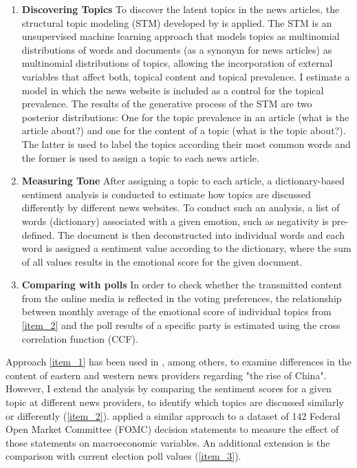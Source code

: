 \documentclass[12pt,a4paper,notitlepage]{article}
\begin{document}
\begin{enumerate}
	\item\label{item_1} \textbf{Discovering Topics} To discover the latent topics in the news articles, the structural topic modeling (STM) developed by \citet{roberts_model_2016} is applied. The STM is an unsupervised machine learning approach that models topics as multinomial distributions of words and documents (as a synonym for news articles) as multinomial distributions of topics, allowing the incorporation of external variables that affect both, topical content and topical prevalence. I estimate a model in which the news website is included as a control for the topical prevalence. The results of the generative process of the STM are two posterior distributions: One for the topic prevalence in an article (what is the article about?) and one for the content of a topic (what is the topic about?). The latter is used to label the topics according their most common words and the former is used to assign a topic to each news article. 
	\item\label{item_2} \textbf{Measuring Tone} After assigning a topic to each article, a dictionary-based sentiment analysis is conducted to estimate how topics are discussed differently by different news websites. To conduct such an analysis, a list of words (dictionary) associated with a given emotion, such as negativity is pre-defined. The document is then deconstructed into individual words and each word is assigned a sentiment value according to the dictionary, where the sum of all values results in the emotional score for the given document.   
	\item\label{item_3} \textbf{Comparing with polls} In order to check whether the transmitted content from the online media is reflected in the voting preferences, the relationship between monthly average of the emotional score of individual topics from \ref{item_2} and the poll results of a specific party is estimated using the cross correlation function (CCF).
\end{enumerate}

Approach \ref{item_1} has been used in \citet{roberts_model_2016}, among others, to examine differences in the content of eastern and western news providers regarding "the rise of China". However, I extend the analysis by comparing the sentiment scores for a given topic at different news providers, to identify which topics are discussed similarly or differently (\ref{item_2}). \citet{hansen_shocking_2016} applied a similar approach to a dataset of 142 Federal Open Market Committee (FOMC) decision statements to measure the effect of those statements on macroeconomic variables. An additional extension is the comparison with current election poll values (\ref{item_3}). 
\end{document}
